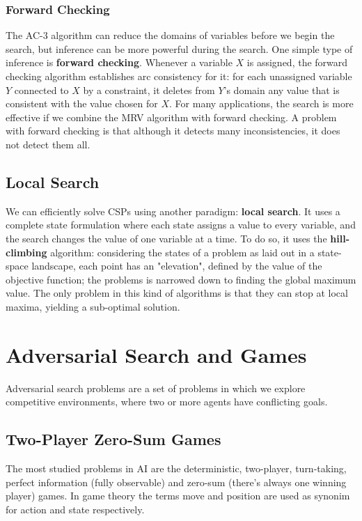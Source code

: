 \documentclass{article}
\begin{document}
\subsubsection{Forward Checking}
The AC-3 algorithm can reduce the domains of variables before we begin the search, but inference can be more powerful during the search. One simple type of inference is \textbf{forward checking}. Whenever a variable \(X\) is assigned, the forward checking algorithm establishes arc consistency for it: for each unassigned variable \(Y\) connected to \(X\) by a constraint, it deletes from \(Y\)'s domain any value that is consistent with the value chosen for \(X\). For many applications, the search is more effective if we combine the MRV algorithm with forward checking. A problem with forward checking is that although it detects many inconsistencies, it does not detect them all.

\subsection{Local Search}
We can efficiently solve CSPs using another paradigm: \textbf{local search}. It uses a complete state formulation where each state assigns a value to every variable, and the search changes the value of one variable at a time. To do so, it uses the \textbf{hill-climbing} algorithm: considering the states of a problem as laid out in a state-space landscape, each point has an "elevation", defined by the value of the objective function; the problems is narrowed down to finding the global maximum value. The only problem in this kind of algorithms is that they can stop at local maxima, yielding a sub-optimal solution.

\newpage
\section{Adversarial Search and Games}
Adversarial search problems are a set of problems in which we explore competitive environments, where two or more agents have conflicting goals.

\subsection{Two-Player Zero-Sum Games}
The most studied problems in AI are the deterministic, two-player, turn-taking, perfect information (fully observable) and zero-sum (there's always one winning player) games. In game theory the terms move and position are used as synonim for action and state respectively.
\end{document}
